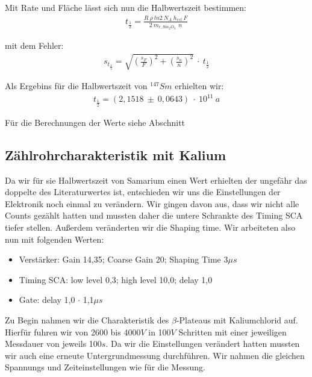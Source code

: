 \documentclass[12pt]{article}
\begin{document}
Mit Rate und Fläche lässt sich nun die Halbwertszeit bestimmen:
\begin{align}
 t_{\frac{1}{2}} = \frac{R~\rho~ln 2 ~ N_A ~ h_{rel} ~ F}{2~m_{r,Sm_2O_3}~~n}
\end{align}

mit dem Fehler:
\begin{align}
 s_{t_{\frac{1}{2}}} = \sqrt{\left(\frac{s_F}{F}\right)^2 + \left(\frac{s_n}{n}\right)^2}~\cdot~t_{\frac{1}{2}}
\end{align}

Als Ergebins für die Halbwertszeit von $^{147}Sm$ erhielten wir:
\begin{align*}
 t_{\frac{1}{2}} = (2,1518~\pm~0,0643)~\cdot~10^11~a
\end{align*}

Für die Berechnungen der Werte siehe Abschnitt %

\subsection{Zählrohrcharakteristik mit Kalium}
Da wir für sie Halbwertszeit von Samarium einen Wert erhielten der ungefähr das doppelte des Literaturwertes ist, entschieden wir uns die Einstellungen der Elektronik noch einmal zu verändern. Wir gingen davon aus, dass wir nicht alle Counts gezählt hatten und mussten daher die untere Schrankte des Timing SCA tiefer stellen. Außerdem veränderten wir die Shaping time. Wir arbeiteten also nun mit folgenden Werten:

\begin{itemize}
 \item Verstärker: Gain 14,35; Coarse Gain 20; Shaping Time 3$\mu s$
 \item Timing SCA: low level 0,3; high level 10,0; delay 1,0
 \item Gate: delay 1,0 $\cdot$ 1,1$\mu s$
\end{itemize}

Zu Begin nahmen wir die Charakteristik des $\beta$-Plateaus mit Kaliumchlorid auf. Hierfür fuhren wir von 2600 bis 4000$V$ in 100$V$ Schritten mit einer jeweiligen
Messdauer von jeweils 100$s$.
Da wir die Einstellungen verändert hatten mussten wir auch eine erneute Untergrundmessung durchführen. Wir nahmen die gleichen Spannungs und Zeiteinstellungen wie für die Messung.
\end{document}
